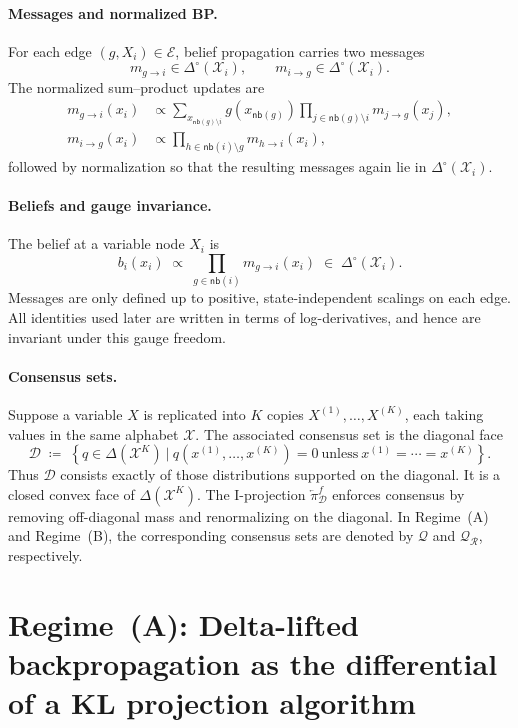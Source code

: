 \documentclass[12pt]{article}
\newcommand{\1}{\mathbb{1}}
\newcommand{\defeq}{\coloneq}
\newcommand{\Menge}[2]{\left\{{#1}~\Big|~{#2}\right\}}
\theoremstyle{definition}
\newcommand{\Iproj}{\overleftarrow{\pi}}     %
\begin{document}
\paragraph{Messages and normalized BP.}
For each edge $(g,X_i)\in\mathcal E$, belief propagation carries two messages
\[
m_{g\to i}\in\Delta^\circ(\mathcal{X}_i),
\qquad
m_{i\to g}\in\Delta^\circ(\mathcal{X}_i).
\]
The normalized sum--product updates are
\begin{align*}
m_{g\to i}(x_i)
&\propto
\sum_{x_{\mathsf{nb}(g)\setminus i}}
  g(x_{\mathsf{nb}(g)})\prod_{j\in\mathsf{nb}(g)\setminus i} m_{j\to g}(x_j),\\
m_{i\to g}(x_i)
&\propto
\prod_{h\in\mathsf{nb}(i)\setminus g} m_{h\to i}(x_i),
\end{align*}
followed by normalization so that the resulting messages again lie in
$\Delta^\circ(\mathcal{X}_i)$.

\paragraph{Beliefs and gauge invariance.}
The belief at a variable node $X_i$ is
\[
b_i(x_i)
\;\propto\;
\prod_{g\in\mathsf{nb}(i)} m_{g\to i}(x_i)
\;\in\;
\Delta^\circ(\mathcal{X}_i).
\]
Messages are only defined up to positive, state-independent scalings on each
edge.
All identities used later are written in terms of log-derivatives, and hence
are invariant under this gauge freedom.

\paragraph{Consensus sets.}
Suppose a variable $X$ is replicated into $K$ copies
$X^{(1)},\dots,X^{(K)}$, each taking values in the same alphabet
$\mathcal{X}$.
The associated consensus set is the diagonal face
\cite[Chapter~26]{bauschke2017convex}
\[
\mathcal D
\;\defeq\;
\Menge{
  q\in\Delta(\mathcal{X}^K)
}{
  q(x^{(1)},\dots,x^{(K)})=0
  \ \text{unless}\ 
  x^{(1)}=\cdots=x^{(K)}
}.
\]
Thus $\mathcal D$ consists exactly of those distributions supported on the
diagonal.
It is a closed convex face of $\Delta(\mathcal{X}^K)$.
The I-projection $\Iproj^f_{\mathcal D}$ enforces consensus by removing
off-diagonal mass and renormalizing on the diagonal.
In Regime~(A) and Regime~(B), the corresponding consensus sets are denoted by
$\mathcal Q$ and $\mathcal Q_{\mathcal R}$, respectively.


\section{Regime~(A): Delta-lifted backpropagation as the differential of a KL projection algorithm}
\label{sec:caseA}
\end{document}
